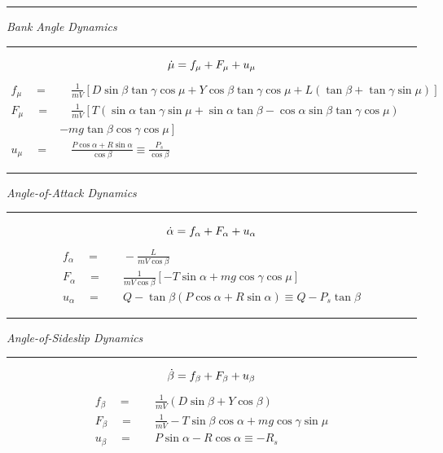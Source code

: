 \documentclass[12pt]{ucthesis}
\begin{document}
\begin{center} {\color{lightgray}\rule[2pt]{2.25in}{1pt}} \noindent \textit{Bank Angle Dynamics} {\color{lightgray}\rule[2pt]{2.25in}{1pt}}  \end{center}%
	\begin{equation} \label{eq: cfbs_mudot}
		\dot{\mu} = f_{\mu} + F_{\mu} + u_{\mu} \\
	\end{equation}
	\begin{align}%
		\label{eq: cfbs_fm} f_{\mu} \quad = & \quad 	\frac{1}{mV} \left[ D\sin\beta\tan\gamma\cos\mu + Y\cos\beta\tan\gamma\cos\mu + L\left(\tan\beta + \tan\gamma\sin\mu\right) \right]\\
		\label{eq: cfbs_Fm} 	F_{\mu} \quad = & \quad  	\frac{1}{mV} \left[ T\left(\sin\alpha\tan\gamma\sin\mu + \sin\alpha\tan\beta - \cos\alpha\sin\beta\tan\gamma\cos\mu\right) \right. \nonumber\\
						& -\left. 	mg\tan\beta\cos\gamma\cos\mu \right] \\
		\label{eq: cfbs_um} u_{\mu} \quad = & \quad 	\frac{P\cos\alpha + R\sin\alpha}{\cos\beta} \equiv \frac{P_s}{\cos\beta}%
	\end{align}%

\begin{center} {\color{lightgray}\rule[2pt]{2.25in}{1pt}} \noindent \textit{Angle-of-Attack Dynamics} {\color{lightgray}\rule[2pt]{2.25in}{1pt}}  \end{center}
	\begin{equation} \label{eq: cfbs_adot}
		\dot{\alpha} = f_{\alpha} + F_{\alpha} + u_{\alpha} \\
	\end{equation}
	\begin{align}
		\label{eq: cfbs_fa} f_{\alpha} \quad =& \quad 	-\frac{L}{mV\cos\beta}\\
		\label{eq: cfbs_Fa} F_{\alpha} \quad =& \quad 	\frac{1}{mV\cos\beta} \left[-T\sin\alpha + mg\cos\gamma\cos\mu \right] \\
		\label{eq: cfbs_ua} u_{\alpha} \quad =& \quad 	Q  - \tan\beta \left( P\cos\alpha + R\sin\alpha \right) \equiv Q - P_s \tan\beta %
	\end{align}
%
\begin{center} {\color{lightgray}\rule[2pt]{2.125in}{1pt}} \noindent \textit{Angle-of-Sideslip Dynamics} {\color{lightgray}\rule[2pt]{2.125in}{1pt}}  \end{center}
	\begin{equation}
		\dot{\beta} = f_{\beta} + F_{\beta} + u_{\beta} \\
		\label{eq: cfbs_bdot}
	\end{equation}
	\begin{align}
		\label{eq: cfbs_fb} f_{\beta} \quad =& \quad 	\frac{1}{mV} \left(D\sin\beta + Y\cos\beta \right)\\
		\label{eq: cfbs_Fb} F_{\beta} \quad =& \quad 	\frac{1}{mV} - T\sin\beta\cos\alpha + mg\cos\gamma\sin\mu \\
		\label{eq: cfbs_ub} u_{\beta} \quad =& \quad 	P\sin\alpha - R\cos\alpha \equiv -R_s
	\end{align}
\end{document}
